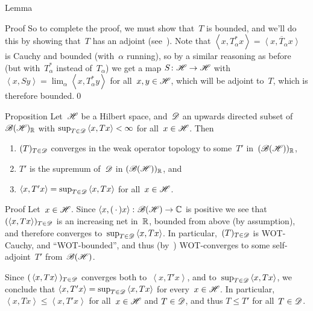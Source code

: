 \documentclass[a]{subfiles}
\begin{document}
\begin{parsec}
\begin{point}{Lemma}
\begin{point}{Proof}
So to complete the proof,
we must show that~$T$ is bounded,
and we'll do this by showing that~$T$ has an adjoint
(see~).
Note that $\left<x,T_\alpha^* x\right>=\overline{\left<x,T_\alpha x\right>}$
is Cauchy and bounded (with~$\alpha$ running),
so by a similar reasoning as before (but with~$T^*_\alpha$
instead of~$T_\alpha$)
we get a map
$S\colon \mathscr{H}\to\mathscr{H}$
with $\left<x,Sy\right>=\lim_\alpha \left<x,T^*_\alpha y\right>$
for all~$x,y\in\mathscr{H}$, which will be adjoint to~$T$,
which is therefore bounded.\qed
\end{point}
\end{point}
\begin{point}{Proposition}%
Let~$\mathscr{H}$ be a Hilbert space,
and~$\mathscr{D}$ an upwards directed subset of~$\mathscr{B}(\mathscr{H})_{\mathbb{R}}$
with $\sup_{T\in \mathscr{D}} \left<x,Tx\right> <\infty$
for all~$x\in \mathscr{H}$. Then
\begin{enumerate}
\item
$(T)_{T\in\mathscr{D}}$
converges 
in the weak operator topology
to some~$T'$ in~$(\mathscr{B}(\mathscr{H}))_{\mathbb{R}}$,
\item
$T'$ is the supremum of~$\mathscr{D}$
in $(\mathscr{B}(\mathscr{H}))_{\mathbb{R}}$,
and 
\item
$\left<x,T'x\right> = 
\sup_{T\in\mathscr{D}}\left<x,Tx\right> $
for all~$x\in \mathscr{H}$.
\end{enumerate}
\begin{point}{Proof}%
Let~$x\in \mathscr{H}$.
Since $\left<x,(\,\cdot\,)x\right>\colon \mathscr{B}(\mathscr{H})\to \mathbb{C}$
is positive
we see that
$(\left<x,Tx\right>)_{T\in\mathscr{D}}$
is an increasing net in~$\mathbb{R}$, 
bounded from above (by assumption),
and therefore converges to~$\sup_{T\in\mathscr{D}}\left<x,Tx\right>$.
In particular,~$(T)_{T\in\mathscr{D}}$
is WOT-Cauchy,
and ``WOT-bounded'',
and thus
(by~)
WOT-converges to some self-adjoint~$T'$ from~$\mathscr{B}(\mathscr{H})$.

Since $(\,\left<x,Tx\right>\,)_{T\in\mathscr{D}}$
converges both to~$\left<x,T'x\right>$,
and to~$\sup_{T\in\mathscr{D}} \left<x,Tx\right>$,
we conclude that $\left<x,T'x\right>=\sup_{T\in\mathscr{D}}\left<x,Tx\right>$
for every~$x\in\mathscr{H}$.
In particular,  $\left<x,Tx\right>\leq \left<x,T'x\right>$
for all~$x\in\mathscr{H}$ and $T\in\mathscr{D}$, and thus $T\leq T'$
for all~$T\in\mathscr{D}$.


\end{point}
\end{point}
\end{parsec}
\end{document}
